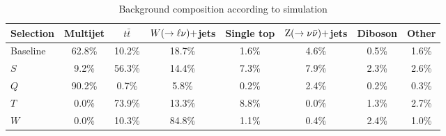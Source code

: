 \begin{table}[htpb]
\centering
\caption{Background composition according to simulation
\label{tab:BG_comp_percent}}
\vspace{1ex}
{\small
\begin{tabular}{ l  c  c  c  c  c  c  c }
\toprule
Selection & Multijet & $t\bar{t}$ & $W(\rightarrow \ell\nu)+$jets & Single top & $\mathrm{Z}(\rightarrow
\nu\bar{\nu})+$jets & Diboson & Other \\  
\midrule
Baseline & 62.8\% & 10.2\% & 18.7\% & 1.6\% & 4.6\% & 0.5\% & 1.6\% \\ 
$S$ & 9.2\% & 56.3\% & 14.4\%  & 7.3\% & 7.9\% & 2.3\% & 2.6\% \\
$Q$ & 90.2\% & 0.7\% & 5.8\%  & 0.2\% & 2.4\% & 0.2\% & 0.3\% \\
$T$ & 0.0\% & 73.9\% & 13.3\%  & 8.8\% & 0.0\% & 1.3\% & 2.7\% \\
$W$ & 0.0\% & 10.3\% & 84.8\%  & 1.1\% & 0.4\% & 2.4\% & 1.0\% \\
\bottomrule
\end{tabular}
}
\end{table}


